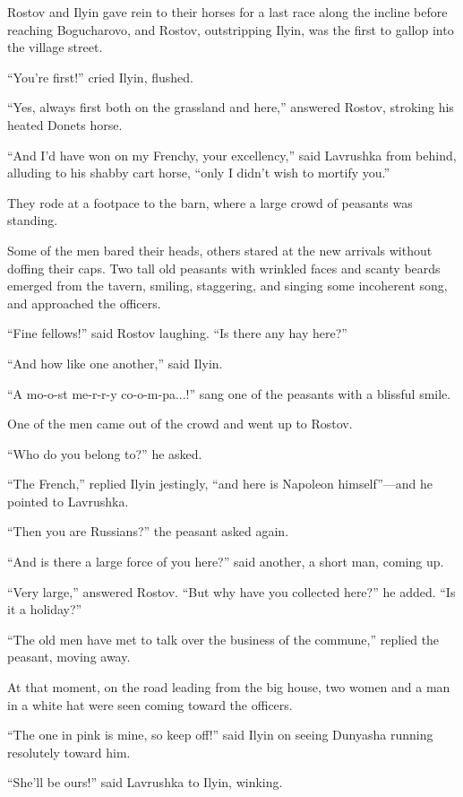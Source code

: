 Rostov and Ilyin gave rein to their horses for a last race along
the incline before reaching Bogucharovo, and Rostov, outstripping
Ilyin, was the first to gallop into the village street.

``You're first!'' cried Ilyin, flushed.

``Yes, always first both on the grassland and here,'' answered
Rostov, stroking his heated Donets horse.

``And I'd have won on my Frenchy, your excellency,'' said
Lavrushka from behind, alluding to his shabby cart horse, ``only
I didn't wish to mortify you.''

They rode at a footpace to the barn, where a large crowd of
peasants was standing.

Some of the men bared their heads, others stared at the new
arrivals without doffing their caps. Two tall old peasants with
wrinkled faces and scanty beards emerged from the tavern,
smiling, staggering, and singing some incoherent song, and
approached the officers.

``Fine fellows!'' said Rostov laughing. ``Is there any hay
here?''

``And how like one another,'' said Ilyin.

``A mo-o-st me-r-r-y co-o-m-pa...!'' sang one of the peasants
with a blissful smile.

One of the men came out of the crowd and went up to Rostov.

``Who do you belong to?'' he asked.

``The French,'' replied Ilyin jestingly, ``and here is Napoleon
himself''---and he pointed to Lavrushka.

``Then you are Russians?'' the peasant asked again.

``And is there a large force of you here?'' said another, a short
man, coming up.

``Very large,'' answered Rostov. ``But why have you collected
here?'' he added. ``Is it a holiday?''

``The old men have met to talk over the business of the
commune,'' replied the peasant, moving away.

At that moment, on the road leading from the big house, two women
and a man in a white hat were seen coming toward the officers.

``The one in pink is mine, so keep off!'' said Ilyin on seeing
Dunyasha running resolutely toward him.

``She'll be ours!'' said Lavrushka to Ilyin, winking.

